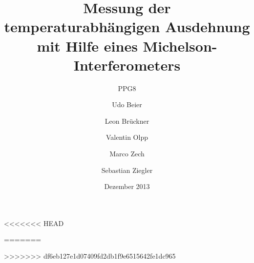 


\title{Messung der temperaturabhängigen Ausdehnung mit Hilfe eines Michelson-Interferometers}
\subtitle{PPG8}
\date{Dezember 2013}
\author{Udo Beier \and Leon Brückner \and Valentin Olpp \and Marco Zech \and Sebastian Ziegler}
\maketitle
\tableofcontents
\listoffigures
\newpage





\newpage
<<<<<<< HEAD
%
%

=======



>>>>>>> df6eb127e1d07409fd2db1f9e6515642fe1dc965

